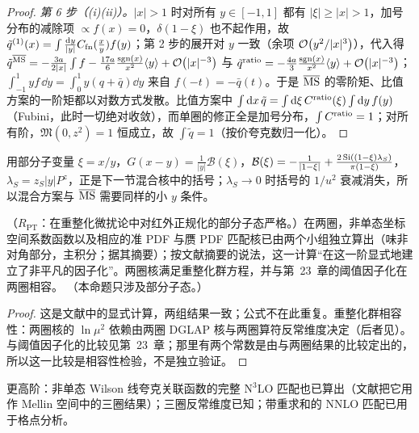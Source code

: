 \begin{proof}
\emph{第 6 步（(i)(ii)）。}$|x|>1$ 时对所有 $y\in[-1,1]$ 都有 $|\xi|\ge|x|>1$，加号分布的减除项 $\propto f(x)=0$，$\delta(1-\xi)$ 也不起作用，故 $\tilde q^{(1)}(x)=\int\frac{\mathrm{d} y}{|y|}C_{\rm fn}(\frac xy)f(y)$；第 2 步的展开对 $y$ 一致（余项 $\mathcal{O}\!\left(y^2/|x|^3\right)$），代入得 $\tilde q^{\overline{\mathrm{MS}}}=-\frac{3a}{2|x|}\int f-\frac{17a}6\frac{{\rm sgn}(x)}{x^2}\langle y\rangle+\mathcal{O}\!\left(|x|^{-3}\right)$ 与 $\tilde q^{\rm ratio}=-\frac{4a}3\frac{{\rm sgn}(x)}{x^2}\langle y\rangle+\mathcal{O}\!\left(|x|^{-3}\right)$；$\int_{-1}^1yf\,\dd y=\int_0^1y(q+\bar q)\dd y$ 来自 $f(-t)=-\bar q(t)$。于是 $\overline{\mathrm{MS}}$ 的零阶矩、比值方案的一阶矩都以对数方式发散。比值方案中 $\int\mathrm{d} x\,\tilde q=\int\mathrm{d}\xi\,C^{\rm ratio}(\xi)\int\mathrm{d} y\,f(y)$（Fubini，此时一切绝对收敛），而单圈的修正全是加号分布，$\int C^{\rm ratio}=1$；对所有阶，$\mathfrak M(0,z^2)=1$ 恒成立，故 $\int\tilde q=1$（按价夸克数归一化）。
\end{proof}

用部分子变量 $\xi=x/y$，$G(x-y)=\frac1{|y|}\mathcal B(\xi)$，$\mathcal B(\xi)=-\frac1{|1-\xi|}+\frac{2\,{\rm Si}((1-\xi)\lambda_S)}{\pi(1-\xi)}$，$\lambda_S=z_S|y|P^z$，正是下一节混合核中的括号；$\lambda_S\to0$ 时括号的 $1/u^2$ 衰减消失，所以混合方案与 $\overline{\mathrm{MS}}$ 需要同样的小 $y$ 条件。

\begin{proposition}\label{prop:lamet-twoloop}
（$R_{\mathrm{PT}}$：在重整化微扰论中对红外正规化的部分子态严格。）在两圈，非单态坐标空间系数函数以及相应的准 PDF 与赝 PDF 匹配核已由两个小组独立算出\cite{Li:2020xml,Chen:2020ody}（味非对角部分\cite{Chen:2020arf}，主积分\cite{Chen:2020iqi}；据其摘要）；按文献\cite{Chen:2020ody}摘要的说法，这一计算“在这一阶显式地建立了非平凡的因子化”。两圈核满足重整化群方程，并与第~23~章的阈值因子化在两圈相容。
（本命题只涉及部分子态。）
\end{proposition}

\begin{proof}
这是文献中的显式计算\cite{Li:2020xml,Chen:2020ody}，两组结果一致；公式不在此重复。重整化群相容性：两圈核的 $\ln\mu^2$ 依赖由两圈 DGLAP 核与两圈算符反常维度决定（后者见\cite{Braun:2020ymy}）。与阈值因子化的比较见第~23~章；那里有两个常数是由与两圈结果的比较定出的，所以这一比较是相容性检验，不是独立验证。
\end{proof}

更高阶：非单态 Wilson 线夸克关联函数的完整 N$^3$LO 匹配也已算出\cite{Cheng:2024wyu}（文献\cite{Ji:2024hit}把它用作 Mellin 空间中的三圈结果）；三圈反常维度已知\cite{Braun:2020ymy}；带重求和的 NNLO 匹配已用于格点分析\cite{Gao:2021dbh,Su:2022fiu}。


